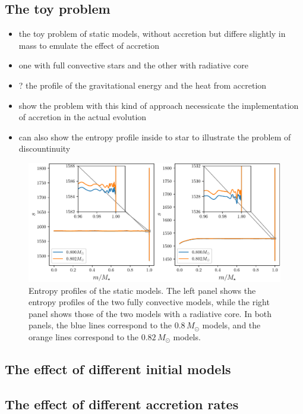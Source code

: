 \documentclass[12pt,a4paper]{article}
\newenvironment{outline}[1]{%
  \begin{itemize}[label=\textbullet]%
  \color{#1}%
}{%
  \end{itemize}%
}
\begin{document}
\subsection{The toy problem}
\label{sec:toy_problem}
\begin{outline}{gray}
  \item the toy problem of static models, without accretion but differe slightly in mass to emulate the effect of accretion
  \item one with full convective stars and the other with radiative core
  \item ? the profile of the gravitational energy and the heat from accretion
  \item show the problem with this kind of approach necessicate the implementation of accretion in the actual evolution 
  \item can also show the entropy profile inside to star to illustrate the problem of discountinuity
\end{outline}

\begin{figure}
  \centering  
  \includegraphics[width=\textwidth,keepaspectratio]{toy_problem_entropy.pdf}
  \caption{Entropy profiles of the static models. The left panel shows the entropy profiles of the two fully convective models, while the right panel shows those of the two models with a radiative core. In both panels, the blue lines correspond to the $0.8\,M_\odot$ models, and the orange lines correspond to the $0.82\,M_\odot$ models.} \label{fig:toy_problem_entropy}
\end{figure}

\subsection{The effect of different initial models}
\label{sec:initial_models}

\subsection{The effect of different accretion rates}
\label{sec:accretion_rate}
\end{document}
